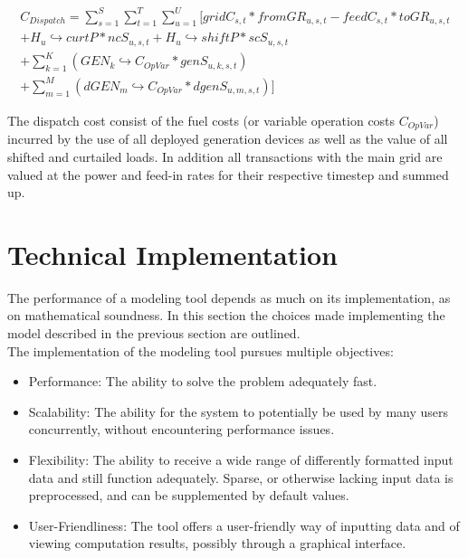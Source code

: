 \documentclass[
	11pt,								%
	DIV10,								%
	a4paper,         					%
	oneside,							%
	headheight=20pt,					%
	footheight=20pt,					%
    parskip=full,						%
    listof=totoc,						%
	bibliography=totoc,					%
	index=totoc,						%
]{scrartcl}
\begin{document}
\begin{equation}
	\begin{split}
		C_{Dispatch} = \sum_{s=1}^{S}\sum_{t=1}^{T}\sum_{u=1}^{U}[gridC_{s,t} * fromGR_{u,s,t} - feedC_{s,t} * toGR_{u,s,t}\\
		+ H_u\hookrightarrow  curtP * ncS_{u,s,t} + H_u\hookrightarrow  shiftP * scS_{u,s,t}\\
		+ \sum_{k=1}^K(GEN_k\hookrightarrow  C_{OpVar} * genS_{u,k,s,t})\\ 
		+ \sum_{m=1}^M(dGEN_m\hookrightarrow  C_{OpVar} * dgenS_{u,m,s,t})]
	\end{split}
\end{equation}

The dispatch cost consist of the fuel costs (or variable operation costs $C_{OpVar}$) incurred by the use of all deployed generation devices as well as the value of all shifted and curtailed loads. In addition all transactions with the main grid are valued at the power and feed-in rates for their respective timestep and summed up.



\newpage
{}	
\section{Technical Implementation}
The performance of a modeling tool depends as much on its implementation, as on mathematical soundness. In this section the choices made implementing the model described in the previous section are outlined.\\
The implementation of the modeling tool pursues multiple objectives:
\begin{itemize}
	\item Performance: The ability to solve the problem adequately fast.
	\item Scalability: The ability for the system to potentially be used by many users concurrently, without encountering performance issues.
	\item Flexibility: The ability to receive a wide range of differently formatted input data and still function adequately. Sparse, or otherwise lacking input data is preprocessed, and can be supplemented by default values.
	\item User-Friendliness: The tool offers a user-friendly way of inputting data and of viewing computation results, possibly through a graphical interface.
\end{itemize}
\end{document}
